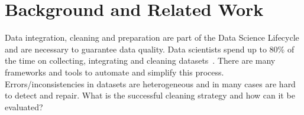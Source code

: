\chapter{Background and Related Work} 
\label{sec:background}
Data integration, cleaning and preparation are part of the Data Science Lifecycle and are necessary to guarantee data quality. 
Data scientists spend up to 80\% of the time on collecting, integrating and cleaning datasets~\cite{80cleansurvey}. There are many frameworks and tools to automate and simplify this process. 
\\
Errors/inconsistencies in datasets are heterogeneous and in many cases are hard to detect and repair. What is the successful cleaning strategy and how can it be evaluated? 





